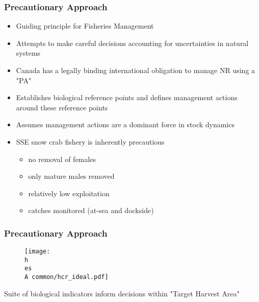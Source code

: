 \documentclass{beamer}
\numberwithin{equation}{section}		%
\numberwithin{figure}{section}	   	%
\numberwithin{table}{section}				%
\newcommand{\yr}{2017}
\newcommand{\D}{.}  %
\newcommand{\h}{C:/} %
\newcommand{\es}{bio.data/bio.snowcrab/} %
\newcommand{\A}{assessments/}
\begin{document}
  


\begin{frame}
\frametitle{Precautionary Approach}

		\begin{itemize}
			\item Guiding principle for Fisheries Management
			\item Attempts to make careful decisions accounting for uncertainties in natural systems
			\item Canada has a legally binding international obligation to manage NR using a "PA"
			\item Establishes biological reference points and defines management actions around these reference points
			\item Assumes management actions are a dominant force in stock dynamics
			\item SSE snow crab fishery is inherently precautious
				\begin{itemize}
				\item no removal of females
				\item only mature males removed
				\item relatively low exploitation
				\item catches monitored (at-sea and dockside)
				\end{itemize}
		\end{itemize}

\end{frame}

\begin{frame}
\frametitle{Precautionary Approach}
\begin{figure}[ht]
	\centering
	\texttt{[image: \\h \\es \\A common/hcr\_ideal.pdf]}
\end{figure}
Suite of biological indicators inform decisions within "Target Harvest Area"
\end{frame}


\end{document}
